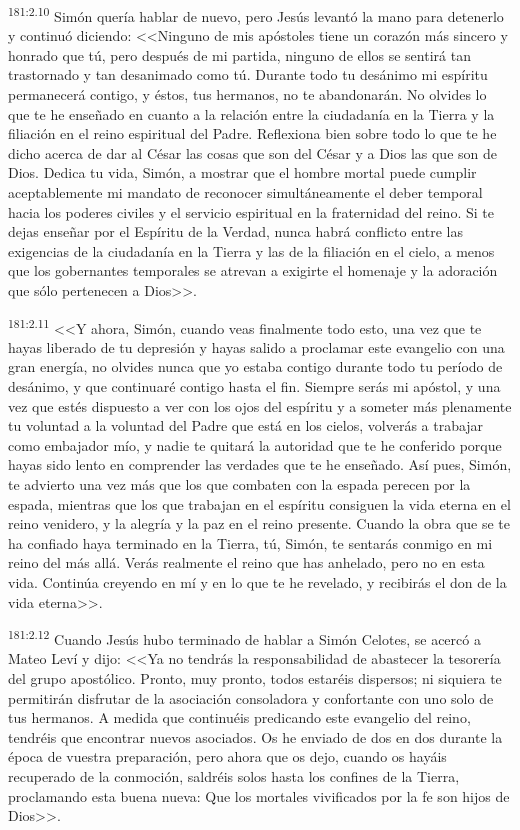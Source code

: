 \par 
\textsuperscript{181:2.10} Simón quería hablar de nuevo, pero Jesús levantó la mano para detenerlo y continuó diciendo: <<Ninguno de mis apóstoles tiene un corazón más sincero y honrado que tú, pero después de mi partida, ninguno de ellos se sentirá tan trastornado y tan desanimado como tú. Durante todo tu desánimo mi espíritu permanecerá contigo, y éstos, tus hermanos, no te abandonarán. No olvides lo que te he enseñado en cuanto a la relación entre la ciudadanía en la Tierra y la filiación en el reino espiritual del Padre. Reflexiona bien sobre todo lo que te he dicho acerca de dar al César las cosas que son del César y a Dios las que son de Dios. Dedica tu vida, Simón, a mostrar que el hombre mortal puede cumplir aceptablemente mi mandato de reconocer simultáneamente el deber temporal hacia los poderes civiles y el servicio espiritual en la fraternidad del reino. Si te dejas enseñar por el Espíritu de la Verdad, nunca habrá conflicto entre las exigencias de la ciudadanía en la Tierra y las de la filiación en el cielo, a menos que los gobernantes temporales se atrevan a exigirte el homenaje y la adoración que sólo pertenecen a Dios>>.

\par 
\textsuperscript{181:2.11} <<Y ahora, Simón, cuando veas finalmente todo esto, una vez que te hayas liberado de tu depresión y hayas salido a proclamar este evangelio con una gran energía, no olvides nunca que yo estaba contigo durante todo tu período de desánimo, y que continuaré contigo hasta el fin. Siempre serás mi apóstol, y una vez que estés dispuesto a ver con los ojos del espíritu y a someter más plenamente tu voluntad a la voluntad del Padre que está en los cielos, volverás a trabajar como embajador mío, y nadie te quitará la autoridad que te he conferido porque hayas sido lento en comprender las verdades que te he enseñado. Así pues, Simón, te advierto una vez más que los que combaten con la espada perecen por la espada, mientras que los que trabajan en el espíritu consiguen la vida eterna en el reino venidero, y la alegría y la paz en el reino presente. Cuando la obra que se te ha confiado haya terminado en la Tierra, tú, Simón, te sentarás conmigo en mi reino del más allá. Verás realmente el reino que has anhelado, pero no en esta vida. Continúa creyendo en mí y en lo que te he revelado, y recibirás el don de la vida eterna>>.

\par 
\textsuperscript{181:2.12} Cuando Jesús hubo terminado de hablar a Simón Celotes, se acercó a Mateo Leví y dijo: <<Ya no tendrás la responsabilidad de abastecer la tesorería del grupo apostólico. Pronto, muy pronto, todos estaréis dispersos; ni siquiera te permitirán disfrutar de la asociación consoladora y confortante con uno solo de tus hermanos. A medida que continuéis predicando este evangelio del reino, tendréis que encontrar nuevos asociados. Os he enviado de dos en dos durante la época de vuestra preparación, pero ahora que os dejo, cuando os hayáis recuperado de la conmoción, saldréis solos hasta los confines de la Tierra, proclamando esta buena nueva: Que los mortales vivificados por la fe son hijos de Dios>>.

